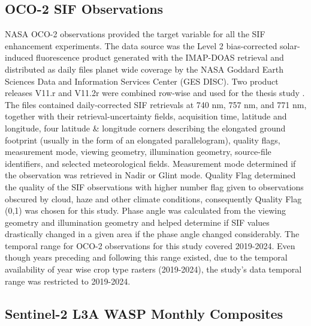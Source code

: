\subsection{OCO-2 SIF Observations}

NASA OCO-2 observations provided the target variable for all the SIF enhancement experiments. The data source was the Level 2 bias-corrected solar-induced fluorescence product generated with the IMAP-DOAS retrieval and distributed as daily files planet wide coverage by the NASA Goddard Earth Sciences Data and Information Services Center (GES DISC). Two product releases V11.r and V11.2r were combined row-wise and used for the thesis study \cite{oco2_sif_v11r,oco2_sif_v112r}.  The files contained daily-corrected SIF retrievals at 740 nm, 757 nm, and 771 nm, together with their retrieval-uncertainty fields, acquisition time, latitude and longitude, four latitude \& longitude corners describing the elongated ground footprint (usually in the form of an elongated parallelogram), quality flags, measurement mode, viewing geometry, illumination geometry, source-file identifiers, and selected meteorological fields. Measurement mode determined if the observation was retrieved in Nadir or Glint mode. Quality Flag determined the quality of the SIF observations with higher number flag given to observations obscured by cloud, haze and other climate conditions, consequently Quality Flag (0,1) was chosen for this study. Phase angle was calculated from the viewing geometry and illumination geometry and helped determine if SIF values drastically changed in a given area if the phase angle changed considerably. The temporal range for OCO-2 observations for this study covered 2019-2024. Even though years preceding and following this range existed, due to the temporal availability of year wise crop type rasters (2019-2024), the study's data temporal range was restricted to 2019-2024. 

\subsection{Sentinel-2 L3A WASP Monthly Composites}


